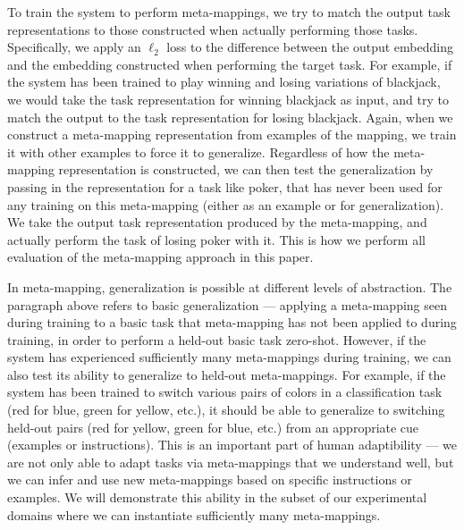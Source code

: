 To train the system to perform meta-mappings, we try to match the output task representations to those constructed when actually performing those tasks. Specifically, we apply an \(\ell_2\) loss to the difference between the output embedding and the embedding constructed when performing the target task. For example, if the system has been trained to play winning and losing variations of blackjack, we would take the task representation for winning blackjack as input, and try to match the output to the task representation for losing blackjack. Again, when we construct a meta-mapping representation from examples of the mapping, we train it with other examples to force it to generalize. Regardless of how the meta-mapping representation is constructed, we can then test the generalization by passing in the representation for a task like poker, that has never been used for any training on this meta-mapping (either as an example or for generalization). We take the output task representation produced by the meta-mapping, and actually perform the task of losing poker with it. This is how we perform all evaluation of the meta-mapping approach in this paper.

In meta-mapping, generalization is possible at different levels of abstraction. The paragraph above refers to basic generalization --- applying a meta-mapping seen during training to a basic task that meta-mapping has not been applied to during training, in order to perform a held-out basic task zero-shot. However, if the system has experienced sufficiently many meta-mappings during training, we can also test its ability to generalize to held-out meta-mappings. For example, if the system has been trained to switch various pairs of colors in a classification task (red for blue, green for yellow, etc.), it should be able to generalize to switching held-out pairs (red for yellow, green for blue, etc.) from an appropriate cue (examples or instructions). This is an important part of human adaptibility --- we are not only able to adapt tasks via meta-mappings that we understand well, but we can infer and use new meta-mappings based on specific instructions or examples. We will demonstrate this ability in the subset of our experimental domains where we can instantiate sufficiently many meta-mappings. 

